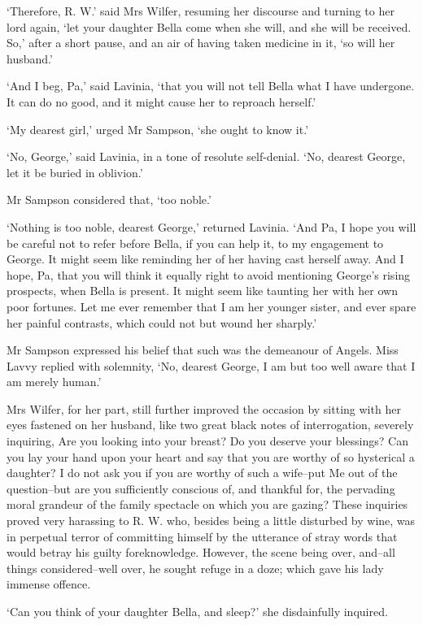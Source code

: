 ‘Therefore, R. W.’ said Mrs Wilfer, resuming her discourse and turning
to her lord again, ‘let your daughter Bella come when she will, and she
will be received. So,’ after a short pause, and an air of having taken
medicine in it, ‘so will her husband.’

‘And I beg, Pa,’ said Lavinia, ‘that you will not tell Bella what I
have undergone. It can do no good, and it might cause her to reproach
herself.’

‘My dearest girl,’ urged Mr Sampson, ‘she ought to know it.’

‘No, George,’ said Lavinia, in a tone of resolute self-denial. ‘No,
dearest George, let it be buried in oblivion.’

Mr Sampson considered that, ‘too noble.’

‘Nothing is too noble, dearest George,’ returned Lavinia. ‘And Pa, I
hope you will be careful not to refer before Bella, if you can help
it, to my engagement to George. It might seem like reminding her of her
having cast herself away. And I hope, Pa, that you will think it equally
right to avoid mentioning George’s rising prospects, when Bella is
present. It might seem like taunting her with her own poor fortunes.
Let me ever remember that I am her younger sister, and ever spare her
painful contrasts, which could not but wound her sharply.’

Mr Sampson expressed his belief that such was the demeanour of Angels.
Miss Lavvy replied with solemnity, ‘No, dearest George, I am but too
well aware that I am merely human.’

Mrs Wilfer, for her part, still further improved the occasion by sitting
with her eyes fastened on her husband, like two great black notes of
interrogation, severely inquiring, Are you looking into your breast? Do
you deserve your blessings? Can you lay your hand upon your heart and
say that you are worthy of so hysterical a daughter? I do not ask you if
you are worthy of such a wife--put Me out of the question--but are
you sufficiently conscious of, and thankful for, the pervading moral
grandeur of the family spectacle on which you are gazing? These
inquiries proved very harassing to R. W. who, besides being a little
disturbed by wine, was in perpetual terror of committing himself by the
utterance of stray words that would betray his guilty foreknowledge.
However, the scene being over, and--all things considered--well over, he
sought refuge in a doze; which gave his lady immense offence.

‘Can you think of your daughter Bella, and sleep?’ she disdainfully
inquired.

